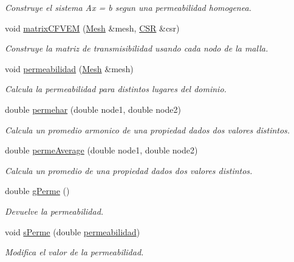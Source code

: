 \begin{DoxyCompactItemize}
\begin{DoxyCompactList}\small\item\em Construye el sistema Ax = b segun una permeabilidad homogenea. \end{DoxyCompactList}\item 
void \hyperlink{class_c_v_f_e_m_afb5dec32452ca35a1354d0a86f338a39}{matrix\+C\+F\+V\+EM} (\hyperlink{class_mesh}{Mesh} \&mesh, \hyperlink{class_c_s_r}{C\+SR} \&csr)
\begin{DoxyCompactList}\small\item\em Construye la matriz de transmisibilidad usando cada nodo de la malla. \end{DoxyCompactList}\item 
void \hyperlink{class_c_v_f_e_m_a7323da10f16f95f4650c4cf020696271}{permeabilidad} (\hyperlink{class_mesh}{Mesh} \&mesh)
\begin{DoxyCompactList}\small\item\em Calcula la permeabilidad para distintos lugares del dominio. \end{DoxyCompactList}\item 
double \hyperlink{class_c_v_f_e_m_af670f51f93d3f38f146ab05ae1527f4d}{permehar} (double node1, double node2)
\begin{DoxyCompactList}\small\item\em Calcula un promedio armonico de una propiedad dados dos valores distintos. \end{DoxyCompactList}\item 
double \hyperlink{class_c_v_f_e_m_a53be673ba0746356b4253b7e1f0699b4}{perme\+Average} (double node1, double node2)
\begin{DoxyCompactList}\small\item\em Calcula un promedio de una propiedad dados dos valores distintos. \end{DoxyCompactList}\item 
double \hyperlink{class_c_v_f_e_m_a87658e6d6b736bc98db71cd9dc5ad9a1}{g\+Perme} ()
\begin{DoxyCompactList}\small\item\em Devuelve la permeabilidad. \end{DoxyCompactList}\item 
void \hyperlink{class_c_v_f_e_m_a716e517bc0c71ae9fbb76537e5b12138}{s\+Perme} (double \hyperlink{class_c_v_f_e_m_a7323da10f16f95f4650c4cf020696271}{permeabilidad})
\begin{DoxyCompactList}\small\item\em Modifica el valor de la permeabilidad. \end{DoxyCompactList}\item 

\end{DoxyCompactItemize}
